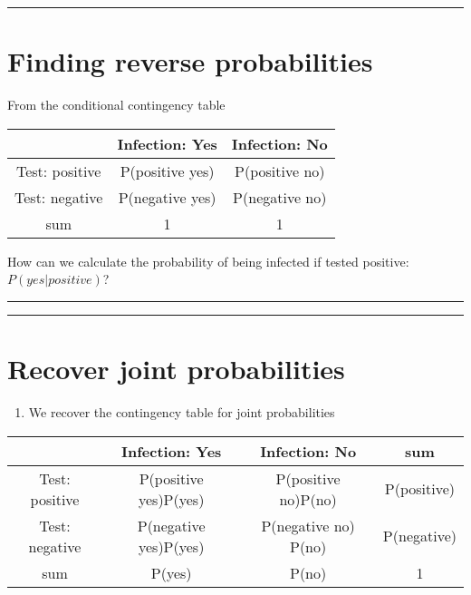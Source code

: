 \documentclass[
]{book}
\providecommand{\tightlist}{%
  \setlength{\itemsep}{0pt}\setlength{\parskip}{0pt}}
\begin{document}
\begin{center}\rule{0.5\linewidth}{0.5pt}\end{center}

\hypertarget{finding-reverse-probabilities}{%
\section{Finding reverse probabilities}\label{finding-reverse-probabilities}}

From the conditional contingency table

\begin{longtable}[]{@{}ccc@{}}
\toprule
& Infection: Yes & Infection: No \\
\midrule
\endhead
Test: positive & P(positive {\textbar{}} yes) & P(positive {\textbar{}} no) \\
Test: negative & P(negative {\textbar{}} yes) & P(negative {\textbar{}} no) \\
sum & 1 & 1 \\
\bottomrule
\end{longtable}

How can we calculate the probability of being infected if tested positive: \(P(yes|positive)\)?

\begin{center}\rule{0.5\linewidth}{0.5pt}\end{center}

\begin{center}\rule{0.5\linewidth}{0.5pt}\end{center}

\hypertarget{recover-joint-probabilities}{%
\section{Recover joint probabilities}\label{recover-joint-probabilities}}

\begin{enumerate}
\def\labelenumi{\arabic{enumi}.}
\tightlist
\item
  We recover the contingency table for joint probabilities
\end{enumerate}

\begin{longtable}[]{@{}cccc@{}}
\toprule
& Infection: Yes & Infection: No & sum \\
\midrule
\endhead
Test: positive & P(positive {\textbar{}} yes)P(yes) & P(positive {\textbar{}} no)P(no) & P(positive) \\
Test: negative & P(negative {\textbar{}} yes)P(yes) & P(negative {\textbar{}} no) P(no) & P(negative) \\
sum & P(yes) & P(no) & 1 \\
\bottomrule
\end{longtable}
\end{document}
